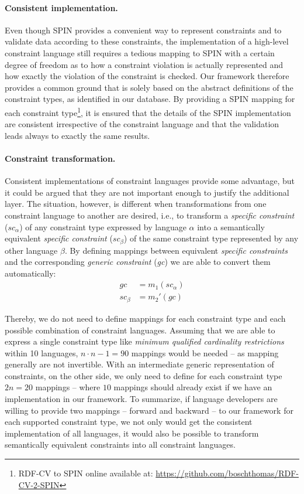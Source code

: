 \documentclass[a4paper,fontsize=11pt]{scrartcl}
\begin{document}
\paragraph{Consistent implementation.}
Even though SPIN provides a convenient way to represent constraints and to validate data according to these constraints, the implementation of a high-level constraint language still requires a tedious mapping to SPIN with a certain degree of freedom as to how a constraint violation is actually represented and how exactly the violation of the constraint is checked.
Our framework therefore provides a common ground that is solely based on the abstract definitions of the constraint types, as identified in our database. By providing a SPIN mapping
for each constraint type\footnote{RDF-CV to SPIN online available at: \url{https://github.com/boschthomas/RDF-CV-2-SPIN}\label{RDF-CV-2-SPIN}}, it is ensured that the details of the SPIN implementation are consistent irrespective of the constraint language and that the validation leads always to exactly the same results.  


\paragraph{Constraint transformation.} Consistent implementations of constraint languages provide some advantage, but it could be argued that they are not important enough to justify the additional layer. The situation, however, is different when transformations from one constraint language to another are desired, i.e., to transform a \emph{specific constraint} (\emph{$sc_{\alpha}$}) of any constraint type expressed by language \emph{$\alpha$} into a semantically equivalent \emph{specific constraint} (\emph{$sc_{\beta}$}) of the same constraint type represented by any other language \emph{$\beta$}.
By defining mappings between equivalent \emph{specific constraints} and the corresponding \emph{generic constraint} (\emph{gc}) we are able to convert them automatically: 
\begin{align*}
  gc &=  m_1(sc_{\alpha}) \\
  sc_{\beta} &= m_2'(gc) 
\end{align*}

Thereby, we do not need to define mappings for each constraint type and each possible combination of constraint languages. Assuming that we are able to express a single constraint type like \emph{minimum qualified cardinality restrictions} within 10 languages, $n \cdot n-1 = 90$ mappings would be needed -- as mapping generally are not invertible. 
With an intermediate generic representation of constraints, on the other side, we only need to define for each constraint type $2n = 20$ mappings -- where $10$ mappings should already exist if we have an implementation in our framework. 
To summarize, if language developers are willing to provide two mappings -- forward and backward -- to our framework for each supported constraint type, we not only would get the consistent implementation of all languages, it would also be possible to transform semantically equivalent constraints into all constraint languages.
\end{document}
